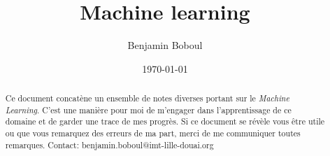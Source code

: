 \documentclass{report}
\title{Machine learning}
\author{Benjamin Boboul}
\date{\today}
\begin{document}
	\maketitle

	\begin{abstract}
	Ce document concatène un ensemble de notes diverses portant sur le \textit{Machine Learning}.
	C'est une manière pour moi de m'engager dans l'apprentissage de ce domaine et de garder une trace de mes progrès.
	Si ce document se révèle vous être utile ou que vous remarquez des erreurs de ma part, merci de me communiquer toutes remarques.
	Contact: benjamin.boboul@imt-lille-douai.org
	\end{abstract}


	
	
	
	
	
	
	
	

	\tableofcontents
	\printglossaries
\end{document}
